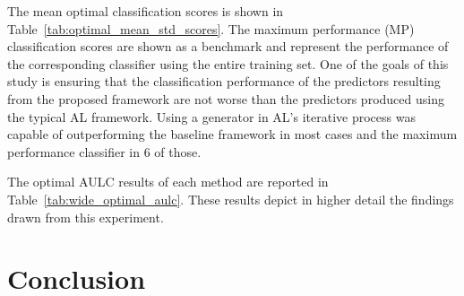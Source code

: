 \documentclass[parskip=full]{scrartcl}
\begin{document}
The mean optimal classification scores is shown in
Table~\ref{tab:optimal_mean_std_scores}. The maximum performance (MP)
classification scores are shown as a benchmark and represent the performance
of the corresponding classifier using the entire training set. One of the
goals of this study is ensuring that the classification performance of the
predictors resulting from the proposed framework are not worse than the
predictors produced using the typical AL framework. Using a generator in AL's
iterative process was capable of outperforming the baseline framework in most
cases and the maximum performance classifier in 6 of those.


The optimal AULC results of each method are reported in
Table~\ref{tab:wide_optimal_aulc}. These results depict in higher detail the
findings drawn from this experiment.


\section{Conclusion}~\label{sec:conclusion}
\end{document}
